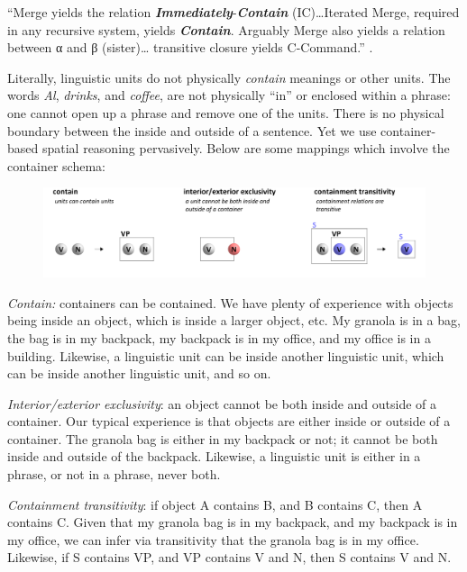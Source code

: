 “Merge yields the relation \textbf{\textit{Immediately}}{}-\textbf{\textit{Contain}} (IC)…Iterated Merge, required in any recursive system, yields \textbf{\textit{Contain}}. Arguably Merge also yields a relation between α and β (sister)… transitive closure yields C-Command.” \citep[3]{Chomsky2001b}.

  Literally, linguistic units do not physically \textit{contain} meanings or other units. The words \textit{Al}, \textit{drinks}, and \textit{coffee}, are not physically “in” or enclosed within a phrase: one cannot open up a phrase and remove one of the units. There is no physical boundary between the inside and outside of a sentence. Yet we use container-based spatial reasoning pervasively. Below are some mappings which involve the container schema:

  
\begin{figure}
\includegraphics[width=\textwidth]{figures/Tilsen-img32.png}
\caption{\missingcaption}
\label{fig:3:4}
\end{figure}
 

\textit{Contain:} containers can be contained. We have plenty of experience with objects being inside an object, which is inside a larger object, etc. My granola is in a bag, the bag is in my backpack, my backpack is in my office, and my office is in a building. Likewise, a linguistic unit can be inside another linguistic unit, which can be inside another linguistic unit, and so on.

\textit{Interior/exterior exclusivity}: an object cannot be both inside and outside of a container. Our typical experience is that objects are either inside or outside of a container. The granola bag is either in my backpack or not; it cannot be both inside and outside of the backpack. Likewise, a linguistic unit is either in a phrase, or not in a phrase, never both.

\textit{Containment transitivity}: if object A contains B, and B contains C, then A contains C. Given that my granola bag is in my backpack, and my backpack is in my office, we can infer via transitivity that the granola bag is in my office. Likewise, if S contains VP, and VP contains V and N, then S contains V and N.

